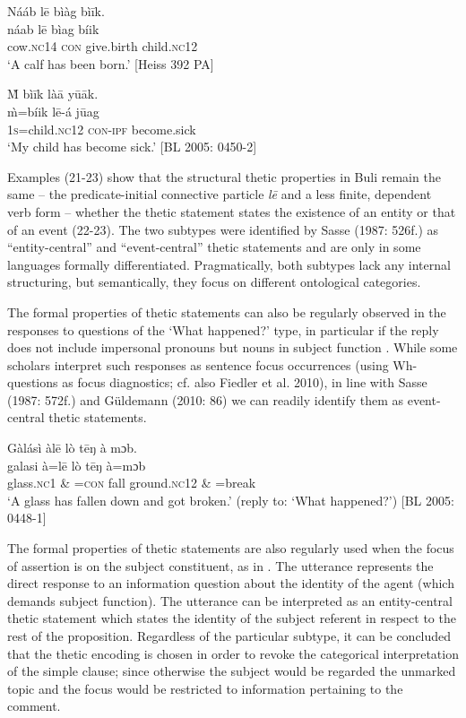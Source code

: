\documentclass[output=paper]{langsci/langscibook}
\begin{document}
\ea
\glll \textup{}  Nááb    l\={e}  bìàg    bì\={i}k.\\
  \textup{  náab    l\={e}  bìag    bíik}\\
       cow.\textsc{nc}14  \textsc{con}   give.birth  child.\textsc{nc}12\\
\glt ‘A calf has been born.’ [Heiss 392 PA]
\z

\ea
\glll \textup{}  \`{M}  bì\={i}k      là\={a}    y\={u}\={a}k.\\
  \textup{  \`{m}=bíik      l\={e}-á    j\={u}ag}\\
       1\textsc{s}=child.\textsc{nc}12    \textsc{con}{}-\textsc{ipf}  become.sick\\
\glt ‘My child has become sick.’ [BL  2005: 0450-2]
\z

Examples (21-23) show that the structural thetic properties in Buli remain the same – the predicate-initial connective particle \textit{l\={e} }and a less finite, dependent verb form – whether the thetic statement states the existence of an entity  or that of an event (22-23). The two subtypes were identified by Sasse (1987: 526f.) as “entity-central” and “event-central” thetic statements and are only in some languages formally differentiated. Pragmatically, both subtypes lack any internal structuring, but semantically, they focus on different ontological categories.

The formal properties of thetic statements can also be regularly observed in the responses to questions of the ‘What happened?’ type, in particular if the reply does not include impersonal pronouns but nouns in subject function . While some scholars interpret such responses as sentence focus occurrences (using Wh-questions as focus diagnostics; cf. also Fiedler et al. 2010), in line with Sasse (1987: 572f.) and Güldemann (2010: 86) we can readily identify them as event-central thetic statements. 

\ea
\glll \textup{}  Gàlásì    àl\={e}    lò  t\={e}ŋ    à   mɔb.\\
  \textup{  galasi}\textup{     à=l\={e}    lò  t\={e}ŋ    à=mɔb}\\
       glass.\textsc{nc}1  \& =\textsc{con}  fall  ground.\textsc{nc}12  \& =break\\
\glt ‘A glass has fallen down and got broken.’ (reply to: ‘What happened?’) [BL  2005: 0448-1]
\z

The formal properties of thetic statements are also regularly used when the focus of assertion is on the subject constituent, as in . The utterance represents the direct response to an information question about the identity of the agent (which demands subject function). The utterance can be interpreted as an entity-central thetic statement which states the identity of the subject referent in respect to the rest of the proposition. Regardless of the particular subtype, it can be concluded that the thetic encoding is chosen in order to revoke the categorical interpretation of the simple clause; since otherwise the subject would be regarded the unmarked topic and the focus would be restricted to information pertaining to the comment. 
\end{document}
